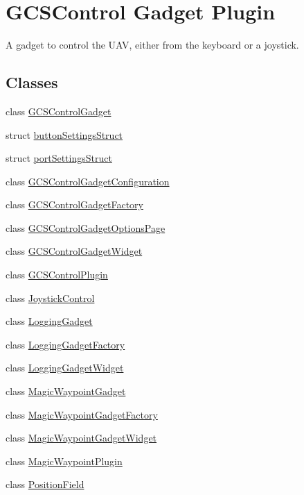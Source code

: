 \hypertarget{group___g_c_s_control_gadget_plugin}{\section{\-G\-C\-S\-Control \-Gadget \-Plugin}
\label{group___g_c_s_control_gadget_plugin}
}


\-A gadget to control the \-U\-A\-V, either from the keyboard or a joystick.  


\subsection*{\-Classes}
\begin{DoxyCompactItemize}
\item 
class \hyperlink{class_g_c_s_control_gadget}{\-G\-C\-S\-Control\-Gadget}
\item 
struct \hyperlink{structbutton_settings_struct}{button\-Settings\-Struct}
\item 
struct \hyperlink{structport_settings_struct}{port\-Settings\-Struct}
\item 
class \hyperlink{class_g_c_s_control_gadget_configuration}{\-G\-C\-S\-Control\-Gadget\-Configuration}
\item 
class \hyperlink{class_g_c_s_control_gadget_factory}{\-G\-C\-S\-Control\-Gadget\-Factory}
\item 
class \hyperlink{class_g_c_s_control_gadget_options_page}{\-G\-C\-S\-Control\-Gadget\-Options\-Page}
\item 
class \hyperlink{class_g_c_s_control_gadget_widget}{\-G\-C\-S\-Control\-Gadget\-Widget}
\item 
class \hyperlink{class_g_c_s_control_plugin}{\-G\-C\-S\-Control\-Plugin}
\item 
class \hyperlink{class_joystick_control}{\-Joystick\-Control}
\item 
class \hyperlink{class_logging_gadget}{\-Logging\-Gadget}
\item 
class \hyperlink{class_logging_gadget_factory}{\-Logging\-Gadget\-Factory}
\item 
class \hyperlink{class_logging_gadget_widget}{\-Logging\-Gadget\-Widget}
\item 
class \hyperlink{class_magic_waypoint_gadget}{\-Magic\-Waypoint\-Gadget}
\item 
class \hyperlink{class_magic_waypoint_gadget_factory}{\-Magic\-Waypoint\-Gadget\-Factory}
\item 
class \hyperlink{class_magic_waypoint_gadget_widget}{\-Magic\-Waypoint\-Gadget\-Widget}
\item 
class \hyperlink{class_magic_waypoint_plugin}{\-Magic\-Waypoint\-Plugin}
\item 
class \hyperlink{class_position_field}{\-Position\-Field}
\end{DoxyCompactItemize}
